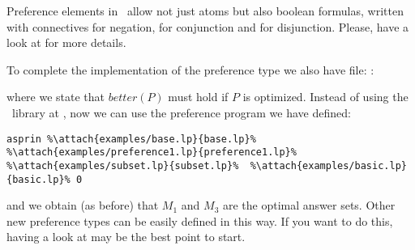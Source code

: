 \begin{note}
Preference elements in \asprin\ allow not just atoms 
but also boolean formulas, written with connectives \code{\~} for negation, 
\code{\&} for conjunction and \code{|} for disjunction.
Please, have a look at \cite{brderosc15a} for more details. 
\eexample
\end{note}

To complete the implementation of the preference type we also have file: 
: 

where we state that $better(P)$ must hold if $P$ is optimized. 
Instead of using the \asprin\ library at , 
now we can use the preference program we have defined:
\begin{lstlisting}[numbers=none,escapechar=\%]
asprin %\attach{examples/base.lp}{base.lp}% %\attach{examples/preference1.lp}{preference1.lp}%  %\attach{examples/subset.lp}{subset.lp}%  %\attach{examples/basic.lp}{basic.lp}% 0
\end{lstlisting}
and we obtain (as before) that $M_1$ and $M_3$ are the optimal answer sets.
Other new preference types can be easily defined in this way.  
If you want to do this, having a look at  may be the best point to start. 

